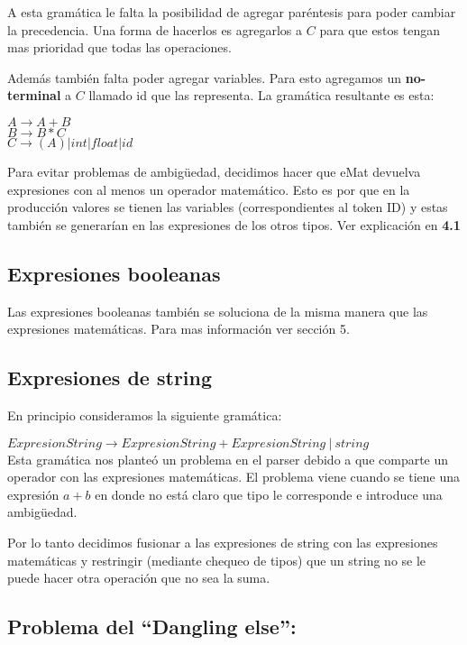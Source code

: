A esta gramática le falta la posibilidad de agregar paréntesis para poder cambiar la precedencia. Una forma de hacerlos es agregarlos a $C$ para que estos tengan mas prioridad que todas las operaciones.

Además también falta poder agregar variables. Para esto agregamos un \textbf{no-terminal} a $C$ llamado id que las representa. La gramática resultante es esta:
\begin{center}
$A \rightarrow A + B$ \\
$B \rightarrow B * C$ \\
$C \rightarrow (A) | int | float | id$ 
\end{center}

Para evitar problemas de ambigüedad, decidimos hacer que eMat devuelva expresiones con al menos un operador matemático. Esto es por que en la producción valores se tienen las variables (correspondientes al token ID) y estas
también se generarían en las expresiones de los otros tipos. Ver explicación en \textbf{4.1}

\subsection{Expresiones booleanas}
Las expresiones booleanas también se soluciona de la misma manera que las expresiones matemáticas. Para mas información ver sección 5.

\subsection{Expresiones de string}
En principio consideramos la siguiente gramática:

$ExpresionString \rightarrow ExpresionString + ExpresionString \ | \ string$ \\

Esta gramática nos planteó un problema en el parser debido a que comparte un operador con las expresiones matemáticas. El problema viene cuando se tiene una expresión $a+b$ en donde no está claro que tipo le corresponde e introduce una ambigüedad.

Por lo tanto decidimos fusionar a las expresiones de string con las expresiones matemáticas y restringir (mediante chequeo de tipos) que un string no se le puede hacer otra operación que no sea la suma.

\subsection{Problema del ``Dangling else'':}


